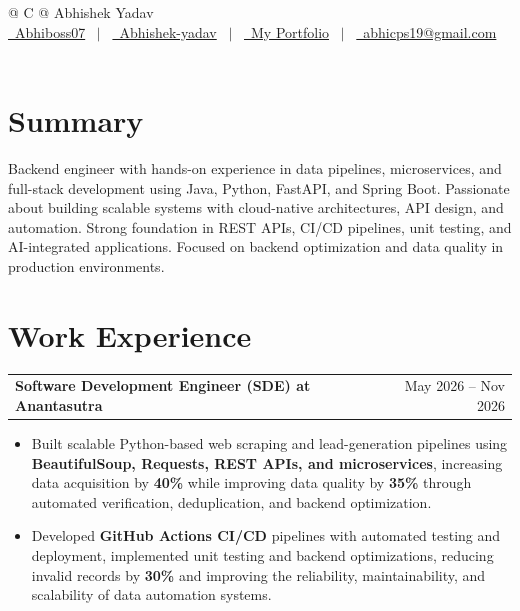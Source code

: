 \documentclass[a4paper,10pt]{article}
\makeatletter
\newenvironment{joblong}[2]
    {
    \begin{tabularx}{\linewidth}{@{}l X r@{}}
    \textbf{#1} & \hfill &  #2 \\[3.50pt]
    \end{tabularx}
    \begin{minipage}[t]{\linewidth}
    \begin{itemize}[nosep,after=\strut, leftmargin=1em, itemsep=3pt,label=--]
    }
    {
    \end{itemize}
    \end{minipage}    
    }
\makeatother
\begin{document}
\pagestyle{empty} 

\begin{tabularx}{\linewidth}{@{} C @{}}
\Huge{Abhishek Yadav}\\[7.5pt]
\href{https://github.com/Abhiboss07}{\raisebox{-0.05\height}\faGithub\ Abhiboss07} \ $|$ \ 
\href{https://linkedin.com/in/abhishek-yadav-4738032b7}{\raisebox{-0.05\height}\faLinkedin\ Abhishek-yadav} \ $|$ \ 
\href{https://portfolio-abhishek-01.vercel.app}{\raisebox{-0.05\height}\faGlobe \ My Portfolio} \ $|$ \ 
\href{mailto:abhicps19@gmail.com}{\raisebox{-0.05\height}\faEnvelope \ abhicps19@gmail.com} \ \ \\
\end{tabularx}

\section{Summary}
Backend engineer with hands-on experience in data pipelines, microservices, and full-stack development using Java, Python, FastAPI, and Spring Boot. Passionate about building scalable systems with cloud-native architectures, API design, and automation. Strong foundation in REST APIs, CI/CD pipelines, unit testing, and AI-integrated applications. Focused on backend optimization and data quality in production environments.

\section{Work Experience}

\begin{joblong}{Software Development Engineer (SDE) at Anantasutra}{May 2026 -- Nov 2026}
\item Built scalable Python-based web scraping and lead-generation pipelines using \textbf{BeautifulSoup, Requests, REST APIs, and microservices}, increasing data acquisition by \textbf{40\%} while improving data quality by \textbf{35\%} through automated verification, deduplication, and backend optimization.
\item Developed \textbf{GitHub Actions CI/CD} pipelines with automated testing and deployment, implemented unit testing and backend optimizations, reducing invalid records by \textbf{30\%} and improving the reliability, maintainability, and scalability of data automation systems.
\end{joblong}
\end{document}
